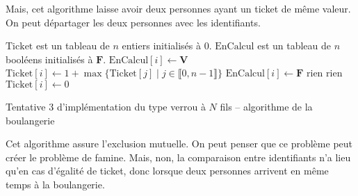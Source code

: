 Mais, cet algorithme laisse avoir deux personnes ayant un ticket de même valeur.
On peut départager les deux personnes avec les identifiants.

\begin{algorithm}[H]
	\centering
	\begin{algorithmic}[1]
		\State $\mathrm{Ticket}$ est un tableau de $n$ entiers initialisés à $0$.
		\State $\mathrm{EnCalcul}$ est un tableau de $n$ booléens initialisés à $\mathbf{F}$.
		\State $\mathrm{EnCalcul}[i] \gets \mathbf{V}$
		\State $\mathrm{Ticket}[i] \gets 1 + \max \{\mathrm{Ticket}[j]  \mid j \in \llbracket 0,n-1 \rrbracket\} $
		\State $\mathrm{EnCalcul}[i] \gets \mathbf{F}$
		\State rien
		\EndWhile
		\State rien
		\EndWhile
		\EndFor
		\EndProcedure
		\State $\mathrm{Ticket}[i] \gets 0$\/
		\EndProcedure
	\end{algorithmic}
	\caption{Tentative 3 d'implémentation du type \textsf{verrou} à $N$ fils -- algorithme de la boulangerie}
\end{algorithm}

Cet algorithme assure l'exclusion mutuelle.
On peut penser que ce problème peut créer le problème de famine.
Mais, non, la comparaison entre identifiants n'a lieu qu'en cas d'égalité de ticket, donc lorsque deux personnes arrivent en même temps à la boulangerie.

